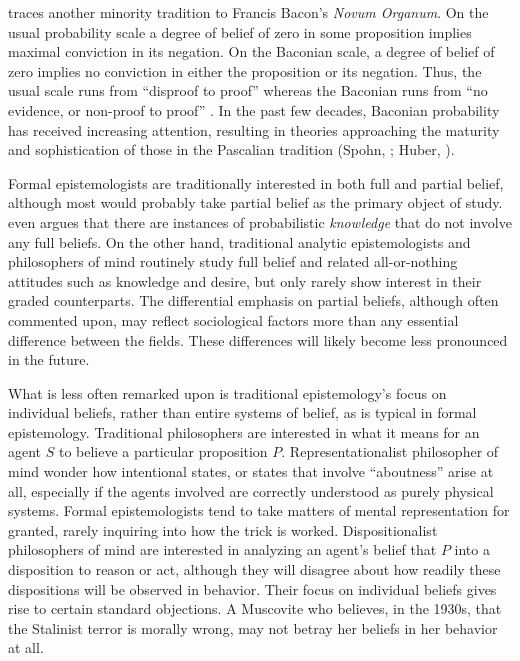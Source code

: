 \citet{cohen1980some} traces another minority tradition to Francis Bacon's {\em
Novum Organum}. On the usual probability scale a degree of belief of zero in
some proposition implies maximal conviction in its negation. On the Baconian
scale, a degree of belief of zero implies no conviction in either the
proposition or its negation. Thus, the usual scale runs from ``disproof to
proof'' whereas the Baconian runs from ``no evidence, or non-proof to proof''
\citep[p. 224]{cohen1980some}.  In the past few decades, Baconian probability
has received increasing attention, resulting in theories approaching the
maturity and sophistication of those in the Pascalian tradition
(Spohn, ; Huber, ).

Formal epistemologists are traditionally interested in both full and partial
belief, although most would probably take partial belief as the primary object
of study. \citet{moss2018probabilistic} even argues that there are instances of
probabilistic {\em knowledge} that do not involve any full beliefs.  On the
other hand, traditional analytic epistemologists and philosophers of mind routinely
study full belief and related all-or-nothing attitudes such as knowledge and
desire, but only rarely show interest in their graded counterparts. The
differential emphasis on partial beliefs, although often commented upon, may
reflect sociological factors more than any essential difference between the
fields. These differences will likely become less pronounced in the future.

What is less often remarked upon is traditional epistemology's focus on
individual beliefs, rather than entire systems of belief, as is typical in
formal epistemology. Traditional philosophers are interested in what it means
for an agent $S$ to believe a particular proposition $P$. Representationalist
philosopher of mind wonder how intentional states, or states that involve
``aboutness'' arise at all, especially if the agents involved are correctly
understood as purely physical systems. Formal epistemologists tend to take
matters of mental representation for granted, rarely inquiring into how the
trick is worked.  Dispositionalist philosophers of mind are interested in
analyzing an agent's belief that $P$ into a disposition to reason or act,
although they will disagree about how readily these dispositions will be
observed in behavior. Their focus on individual beliefs gives rise to certain
standard objections. A Muscovite who believes, in the 1930s, that the Stalinist
terror is morally wrong, may not betray her beliefs in her behavior at all.

